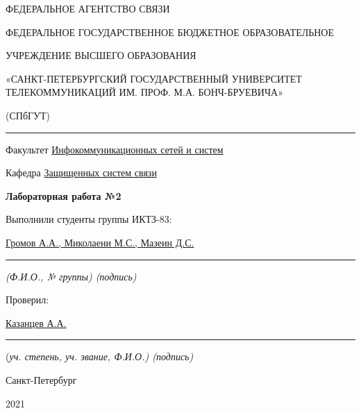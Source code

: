 \documentclass[a4paper,14pt]{extarticle}
\begin{document}
    \begin{center}
        \thispagestyle{empty}
        \begin{singlespace}
        ФЕДЕРАЛЬНОЕ АГЕНТСТВО СВЯЗИ

        ФЕДЕРАЛЬНОЕ ГОСУДАРСТВЕННОЕ БЮДЖЕТНОЕ ОБРАЗОВАТЕЛЬНОЕ

        УЧРЕЖДЕНИЕ ВЫСШЕГО ОБРАЗОВАНИЯ

        «САНКТ-ПЕТЕРБУРГСКИЙ ГОСУДАРСТВЕННЫЙ УНИВЕРСИТЕТ ТЕЛЕКОММУНИКАЦИЙ ИМ. ПРОФ. М.А. БОНЧ-БРУЕВИЧА»

        (СПбГУТ)
        \end{singlespace}
        \vspace{-1ex}
        \rule{\textwidth}{0.4pt}
        \vspace{-5ex}

        Факультет \underline{Инфокоммуникационных сетей и систем}

        Кафедра \underline{Защищенных систем связи}
        \vspace{10ex}

        \textbf{Лабораторная работа №2}\\
        


    \end{center}
    \vspace{4ex}
    \begin{flushright}
    \parbox{10 cm}{
    \begin{flushleft}
        Выполнили студенты группы ИКТЗ-83:

        \underline{Громов А.А., Миколаени М.С., Мазеин Д.С.} \hfill \rule[-0.85ex]{0.1\textwidth}{0.6pt}

        \footnotesize \textit{ (Ф.И.О., № группы) \hfill (подпись)} \normalsize

        Проверил:

        \underline{Казанцев А.А.} \hfill \rule[-0.85ex]{0.1\textwidth}{0.6pt}

        (\footnotesize \textit{уч. степень, уч. звание, Ф.И.О.) \hfill (подпись)} \normalsize

    \end{flushleft}
    }
    \end{flushright}
    \begin{center}
        \vfill
        Санкт-Петербург

        2021

    \end{center}
    \newpage
\end{document}

